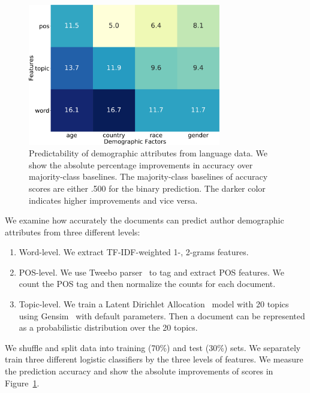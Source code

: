 \begin{figure}[tb!]
\centering
\includegraphics[width=0.75\textwidth]{images/chapter5/predictability.pdf}
\caption{Predictability of demographic attributes from language
data. We show the absolute percentage improvements in accuracy over majority-class baselines. The majority-class baselines of accuracy scores are either .500 for the binary prediction. The darker color indicates higher improvements and vice versa.}
\label{chap5:fig:predictability}
\end{figure}

We examine how accurately the documents can predict author demographic attributes from three different levels:
\begin{enumerate}
    \item Word-level. We extract TF-IDF-weighted 1-, 2-grams features.
    \item POS-level. We use Tweebo parser~\cite{kong2014dependency} to tag and extract POS features. We count the POS tag and then normalize the counts for each document.
    \item Topic-level. We train a Latent Dirichlet Allocation~\cite{blei2003latent} model with 20 topics using Gensim~\cite{rehurek2010software} with default parameters. Then a document can be represented as a probabilistic distribution over the 20 topics.
\end{enumerate}

We shuffle and split data into training (70\%) and test (30\%) sets.
We separately train three different logistic classifiers by the three levels of features.
We measure the prediction accuracy and show the absolute improvements of scores in Figure~\ref{chap5:fig:predictability}.


